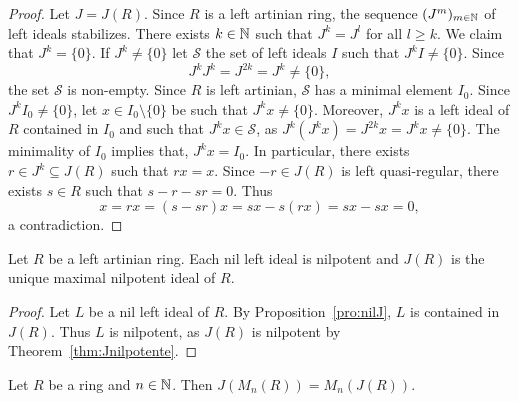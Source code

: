 \begin{proof}
	Let $J=J(R)$. Since $R$ is a left artinian ring, the sequence 
	$(J^m)_{m\in\mathbb{N}}$ of left ideals stabilizes. There exists 
	$k\in\mathbb{N}$ such that $J^k=J^l$ for all $l\geq k$. We claim that $J^k=\{0\}$. If
	$J^k\ne\{0\}$ let $\mathcal{S}$ the set of left ideals 
	$I$ such that $J^kI\ne\{0\}$. Since 
	\[
	J^kJ^k=J^{2k}=J^k\ne\{0\},
	\]
	the set $\mathcal{S}$ is non-empty. 
	Since $R$ is left artinian, $\mathcal{S}$ has a minimal element $I_0$. Since $J^kI_0\ne\{0\}$, let $x\in
	I_0\setminus\{0\}$ be such that $J^kx\ne\{0\}$. Moreover, $J^kx$ is a left ideal of $R$ 
	contained in $I_0$ and such that $J^kx\in\mathcal{S}$, as 
	$J^k(J^kx)=J^{2k}x=J^kx\ne\{0\}$. The minimality of $I_0$ implies that, $J^kx=I_0$. In particular, 
	there exists $r\in J^k\subseteq J(R)$ such that $rx=x$. Since $-r\in
	J(R)$ is left quasi-regular, there exists $s\in R$ such that $s-r-sr=0$.
	Thus 
	\[
		x=rx=(s-sr)x=sx-s(rx)=sx-sx=0,
	\]
	a contradiction.
\end{proof}

\begin{corollary}
	Let $R$ be a left artinian ring. Each nil left ideal is nilpotent and 
	$J(R)$ is the unique maximal nilpotent ideal of $R$. 
\end{corollary}

\begin{proof}
	Let $L$ be a nil left ideal of $R$. By Proposition~\ref{pro:nilJ}, $L$
	is contained in $J(R)$. Thus $L$ is nilpotent, as $J(R)$ 
	is nilpotent by Theorem~\ref{thm:Jnilpotente}. 
\end{proof}

\begin{theorem}
	Let $R$ be a ring and $n\in\mathbb{N}$. Then $J(M_n(R))=M_n(J(R))$. 
\end{theorem}

